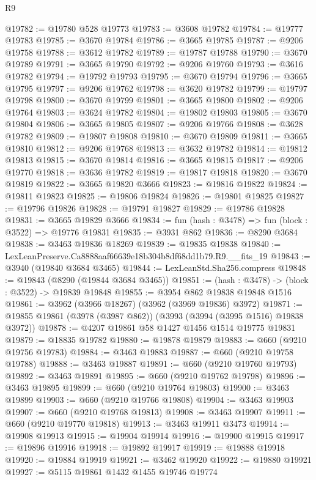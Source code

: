 \begin{lexlean}{R9}
\begin{coremodule}
@19782 := @19780 @528 @19773
@19783 := @3608 @19782
@19784 := @19777 @19783
@19785 := @3670 @19784
@19786 := @3665 @19785
@19787 := @9206 @19758
@19788 := @3612 @19782
@19789 := @19787 @19788
@19790 := @3670 @19789
@19791 := @3665 @19790
@19792 := @9206 @19760
@19793 := @3616 @19782
@19794 := @19792 @19793
@19795 := @3670 @19794
@19796 := @3665 @19795
@19797 := @9206 @19762
@19798 := @3620 @19782
@19799 := @19797 @19798
@19800 := @3670 @19799
@19801 := @3665 @19800
@19802 := @9206 @19764
@19803 := @3624 @19782
@19804 := @19802 @19803
@19805 := @3670 @19804
@19806 := @3665 @19805
@19807 := @9206 @19766
@19808 := @3628 @19782
@19809 := @19807 @19808
@19810 := @3670 @19809
@19811 := @3665 @19810
@19812 := @9206 @19768
@19813 := @3632 @19782
@19814 := @19812 @19813
@19815 := @3670 @19814
@19816 := @3665 @19815
@19817 := @9206 @19770
@19818 := @3636 @19782
@19819 := @19817 @19818
@19820 := @3670 @19819
@19822 := @3665 @19820 @3666
@19823 := @19816 @19822
@19824 := @19811 @19823
@19825 := @19806 @19824
@19826 := @19801 @19825
@19827 := @19796 @19826
@19828 := @19791 @19827
@19829 := @19786 @19828
@19831 := @3665 @19829 @3666
@19834 := fun (hash : @3478) => fun (block : @3522) => @19776 @19831
@19835 := @3931 @862
@19836 := @8290 @3684
@19838 := @3463 @19836 @18269
@19839 := @19835 @19838
@19840 := LexLeanPreserve.Ca8888aaf66639e18b304b8df68dd1b79.R9.__fits_19
@19843 := @3940 (@19840 @3684 @3465)
@19844 := LexLeanStd.Sha256.compress
@19848 := @19843 (@8290 (@19844 @3684 @3465))
@19851 := (hash : @3478) -> (block : @3522) -> @19839 @19848
@19855 := @3954 @862 @19838 @19848 @1516
@19861 := @3962 (@3966 @18267) (@3962 (@3969 @19836) @3972)
@19871 := @19855 @19861 (@3978 (@3987 @862)) (@3993 (@3994 (@3995 @1516) @19838 @3972))
@19878 := @4207 @19861 @58 @1427 @1456 @1514 @19775 @19831
@19879 := @18835 @19782
@19880 := @19878 @19879
@19883 := @660 (@9210 @19756 @19783)
@19884 := @3463 @19883
@19887 := @660 (@9210 @19758 @19788)
@19888 := @3463 @19887
@19891 := @660 (@9210 @19760 @19793)
@19892 := @3463 @19891
@19895 := @660 (@9210 @19762 @19798)
@19896 := @3463 @19895
@19899 := @660 (@9210 @19764 @19803)
@19900 := @3463 @19899
@19903 := @660 (@9210 @19766 @19808)
@19904 := @3463 @19903
@19907 := @660 (@9210 @19768 @19813)
@19908 := @3463 @19907
@19911 := @660 (@9210 @19770 @19818)
@19913 := @3463 @19911 @3473
@19914 := @19908 @19913
@19915 := @19904 @19914
@19916 := @19900 @19915
@19917 := @19896 @19916
@19918 := @19892 @19917
@19919 := @19888 @19918
@19920 := @19884 @19919
@19921 := @3462 @19920
@19922 := @19880 @19921
@19927 := @5115 @19861 @1432 @1455 @19746 @19774

\end{coremodule}
\end{lexlean}
